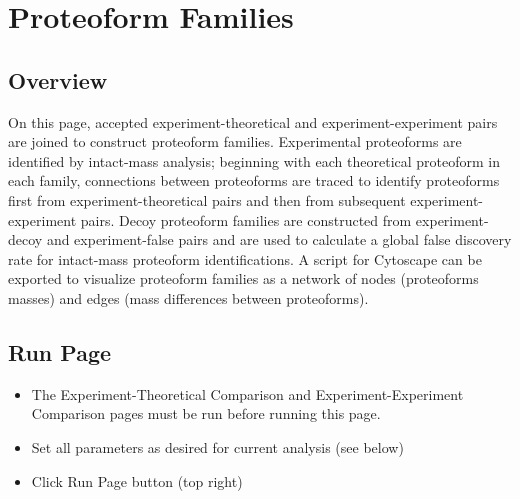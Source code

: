 
\section{Proteoform Families}

\subsection{Overview}

On this page, accepted experiment-theoretical and experiment-experiment pairs are joined to construct proteoform families. Experimental proteoforms are identified by intact-mass analysis; beginning with each theoretical proteoform in each family, connections between proteoforms are traced to identify proteoforms first from experiment-theoretical pairs and then from subsequent experiment-experiment pairs. Decoy proteoform families are constructed from experiment-decoy and experiment-false pairs and are used to calculate a global false discovery rate for intact-mass proteoform identifications. A script for Cytoscape\supercite{Shannon2003,Smoot2011} can be exported to visualize proteoform families as a network of nodes (proteoforms masses) and edges (mass differences between proteoforms). 

\subsection{Run Page}
\begin{itemize}
\item The Experiment-Theoretical Comparison and Experiment-Experiment Comparison pages must be run before running this page.
\item Set all parameters as desired for current analysis (see below)
\item Click Run Page button (top right)
\end{itemize}

